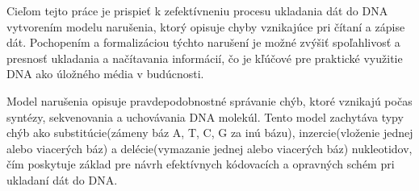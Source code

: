 Cieľom tejto práce je prispieť k zefektívneniu procesu ukladania
dát do DNA vytvorením modelu narušenia, ktorý opisuje chyby vznikajúce pri čítaní a zápise dát.
Pochopením a formalizáciou týchto narušení je možné zvýšiť spoľahlivosť a presnosť ukladania
a načítavania informácií, čo je kľúčové pre praktické využitie DNA ako úložného média v budúcnosti.

Model narušenia opisuje pravdepodobnostné správanie chýb, ktoré vznikajú počas syntézy,
sekvenovania a uchovávania DNA molekúl. Tento model zachytáva typy chýb ako substitúcie(zámeny báz A, T, C, G za inú bázu),
inzercie(vloženie jednej alebo viacerých báz) a delécie(vymazanie jednej alebo viacerých báz) nukleotidov, čím poskytuje základ pre návrh efektívnych kódovacích
a opravných schém pri ukladaní dát do DNA.
